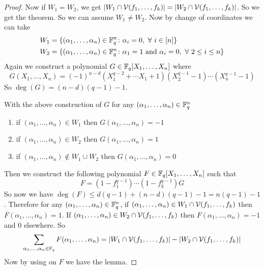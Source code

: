 \begin{proof}
  Now if $W_1=W_2$, we get $|W_1\cap \mathcal{V}(f_1,\dots,f_k)|=|W_2\cap \mathcal{V}(f_1,\dots, f_k)|$. So we get the theorem. So we can assume $W_1\neq W_2$. Now by change of coordinates we can take \begin{align*}
    & W_1 = \{(\alpha_1,\dots, \alpha_n)\in\mathbb{F}_q^n\colon \alpha_i=0,\ \forall\ i\in[n]\}\\ 
    & W_2 = \{(\alpha_1,\dots, \alpha_n)\in\mathbb{F}_q^n\colon \alpha_1=1\text{ and }\alpha_i=0,\ \forall\ 2\leq i\leq n\}\\ 
  \end{align*}
  Again we construct a polynomial $G\in\mathbb{F}_q[X_1,\dots, X_n]$ where $$G(X_1,\dots, X_n)=(-1)^{n-d}(X_1^{q-2}+\cdots X_1+1)(X_2^{q-1}-1)\cdots (X_n^{q-1}-1)$$So $\deg(G)=(n-d)(q-1)-1$. 
  \begin{observation}
    With the above construction of $G$ for any $(\alpha_1,\dots,\alpha_n)\in\mathbb{F}_q^n$ \begin{enumerate}[label=(\roman*)]
      \item if $(\alpha_1,\dots,\alpha_n)\in W_1$ then $G(\alpha_1,\dots, \alpha_n)=-1$
      \item if $(\alpha_1,\dots,\alpha_n)\in W_2$ then $G(\alpha_1,\dots, \alpha_n)=1$
      \item if $(\alpha_1,\dots,\alpha_n)\notin W_1\cup W_2$ then $G(\alpha_1,\dots, \alpha_n)=0$
    \end{enumerate}
  \end{observation}
  Then we construct the following polynomial $F\in\mathbb{F}_q[X_1,\dots, X_n]$ such that $$F=(1-f_1^{q-1})\cdots (1-f_k^{q-1})G$$So now we have $\deg(F)\leq d(q-1)+(n-d)(q-1)-1=n(q-1)-1$. Therefore for any $(\alpha_1,\dots,\alpha_n)\in\mathbb{F}_q^n$, if $(\alpha_1,\dots,\alpha_n)\in W_1\cap \mathcal{V}(f_1,\dots, f_k)$ then $F(\alpha_1,\dots, \alpha_n)=1$. If $(\alpha_1,\dots,\alpha_n)\in W_2\cap \mathcal{V}(f_1,\dots, f_k)$ then $F(\alpha_1,\dots, \alpha_n)=-1$ and $0$ elsewhere. So $$\sum_{\alpha_1,\dots,\alpha_n\in\mathbb{F}_q}F(\alpha_1,\dots,\alpha_n)=|W_1\cap \mathcal{V}(f_1,\dots,f_k)|- |W_2\cap \mathcal{V}(f_1,\dots, f_k)|$$Now by using \CWthm on $F$ we have the lemma. 
\end{proof}

